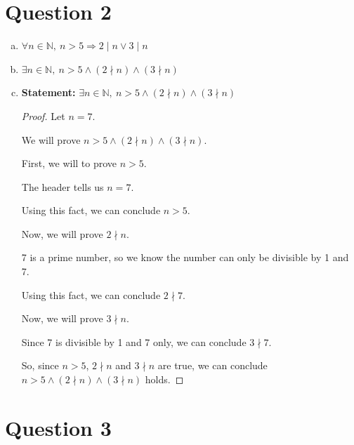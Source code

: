 \documentclass[12pt]{article}
\begin{document}
\section*{Question 2}
\begin{enumerate}[a.]
    \item $\forall n \in \mathbb{N},\:n > 5 \Rightarrow 2 \mid n \lor 3 \mid n$
    \item $\exists n \in \mathbb{N},\: n > 5 \land (2 \nmid n) \land (3 \nmid n)$
    \item

    \textbf{Statement:} $\exists n \in \mathbb{N},\: n > 5 \land (2 \nmid n) \land (3 \nmid n)$

    \begin{proof}
        Let $n = 7$.

        \bigskip

        We will prove $n>5 \land (2 \nmid n) \land (3 \nmid n)$.

        \bigskip

        First, we will to prove $n > 5$.

        \bigskip

        The header tells us $n = 7$.

        \bigskip

        Using this fact, we can conclude $n > 5$.

        \bigskip

        Now, we will prove $2 \nmid n$.

        \bigskip

        7 is a prime number, so we know the number can only be divisible by 1 and 7.

        \bigskip

        Using this fact, we can conclude $2 \nmid 7$.

        \bigskip

        Now, we will prove $3 \nmid n$.

        \bigskip

        Since 7 is divisible by 1 and 7 only, we can conclude $3 \nmid 7$.

        \bigskip

        So, since $n > 5$, $2 \nmid n$ and $3 \nmid n$ are true, we
        can conclude $n>5 \land (2 \nmid n) \land (3 \nmid n)$ holds.
    \end{proof}
\end{enumerate}

\section*{Question 3}
\end{document}
